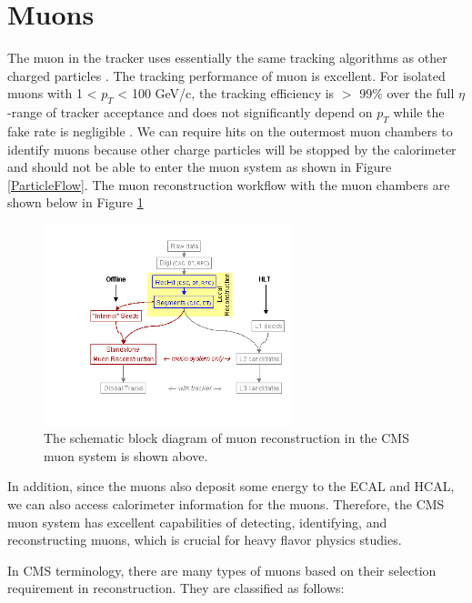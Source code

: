 \section{Muons}

The muon in the tracker uses essentially the same tracking algorithms as other charged particles \cite{CMSTrackComp}. The tracking performance of muon is excellent. For isolated muons with 1 < $p_T$ < 100 GeV/c, the tracking efficiency is $>$ 99\% over the full $\eta$-range of tracker acceptance and does not significantly depend on $p_T$ while the fake rate is negligible \cite{CMSTrackComp}. We can require hits on the outermost muon chambers to identify muons because other charge particles will be stopped by the calorimeter and should not be able to enter the muon system as shown in Figure \ref{ParticleFlow}. The muon reconstruction workflow with the muon chambers are shown below in Figure \ref{MuonReco}


\begin{figure}[hbtp]
\begin{center}
\includegraphics[width=0.65\textwidth]{Figures/Chapter4/MuonReco.png}
\caption{The schematic block diagram of muon reconstruction in the CMS muon system is shown above.}
\label{MuonReco}
\end{center}
\end{figure} 

In addition, since the muons also deposit some energy to the ECAL and HCAL, we can also access calorimeter information for the muons. Therefore, the CMS muon system has excellent capabilities of detecting, identifying, and reconstructing muons, which is crucial for heavy flavor physics studies. 

In CMS terminology, there are many types of muons based on their selection requirement in reconstruction. They are classified as follows:



